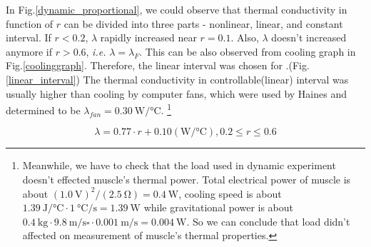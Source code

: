 In Fig.\ref{dynamic_proportional}, we could observe that thermal conductivity in function of $r$ can be divided into three parts - nonlinear, linear, and constant interval. If $r<0.2$, $\lambda$ rapidly increased near $r=0.1$. Also, $\lambda$ doesn't increased anymore if $r>0.6$, {\it i.e.} $\lambda = \lambda_{F}$. This can be also observed from cooling graph in Fig.\ref{coolinggraph}.
Therefore, the linear interval was chosen for \Apcnospace.(Fig.\ref{linear_interval}) The thermal conductivity in controllable(linear) interval was usually higher than cooling by computer fans, which were used by Haines \etalspace and determined to be $\lambda_{fan}=\SI{0.30}{\watt\per\degreeCelsius}$.
\footnote{
	Meanwhile, we have to check that the load used in dynamic experiment doesn't effected muscle's thermal power. %
	Total electrical power of muscle is about $(\SI{1.0}{\volt})^2/(\SI{2.5}{\ohm})=\SI{0.4}{\watt}$, cooling speed is about $\SI{1.39}{\joule\per\degreeCelsius} \cdot \SI{1}{\degreeCelsius\per\second}=\SI{1.39}{\watt}$ while gravitational power is about  $\SI{0.4}{\kilo\gram} \cdot  \SI{9.8}{\meter\per\second\square} \cdot \SI{0.001}{\meter\per\second}=\SI{0.004}{\watt}$. So we can conclude that load didn't affected on measurement of muscle's thermal properties.
}

\begin{equation} \label{lambda_control}
\lambda = 0.77\cdot r + 0.10 (\si{\watt\per\degreeCelsius}), 0.2\leq r \leq 0.6
\end{equation}





